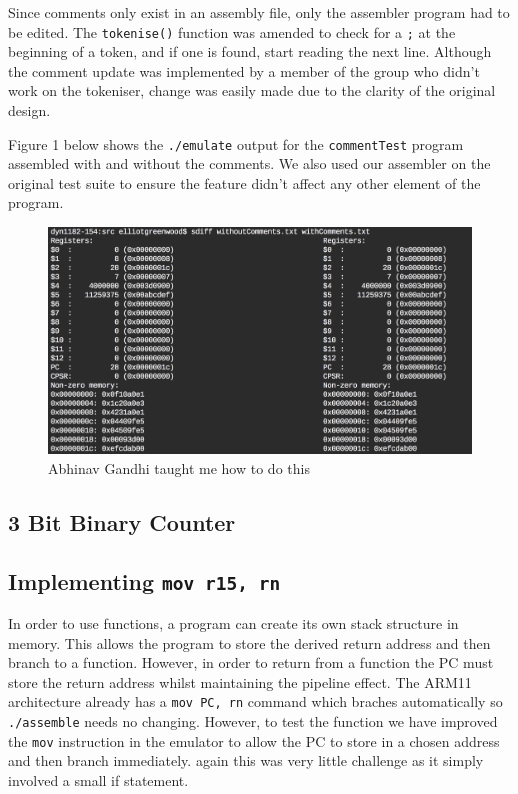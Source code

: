 \documentclass[11pt]{article}
\begin{document}
\noindent Since comments only exist in an assembly file, only the assembler program had to be edited. The \verb|tokenise()| function was amended to check for a \texttt{;} at the beginning of a token, and if one is found, start reading the next line. Although the comment update was implemented by a member of the group who didn't work on the tokeniser, change was easily made due to the clarity of the original design.\newline

\noindent Figure 1 below shows the \texttt{./emulate} output for the \texttt{commentTest} program assembled with and without the comments. We also used our assembler on the original test suite to ensure the feature didn't affect any other element of the program.


\begin{figure}[H]
	\centering
	\includegraphics[scale = 0.5]{commentTest}
	\caption{Abhinav Gandhi taught me how to do this}
\end{figure}

\subsection{3 Bit Binary Counter}
\subsection{Implementing \texttt{mov r15, rn}}
In order to use functions, a program can create its own stack structure in memory. This allows the program to store the derived return address and then branch to a function. However, in order to return from a function the PC must store the return address whilst maintaining the pipeline effect. The ARM11 architecture already has a \texttt{mov PC, rn} command which braches automatically so \texttt{./assemble} needs no changing. However, to test the function we have improved the \texttt{mov} instruction in the emulator to allow the PC to store in a chosen address and then branch immediately. again this was very little challenge as it simply involved a small if statement.
\end{document}
